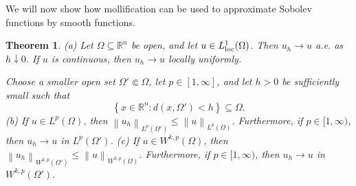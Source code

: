 \documentclass{book}
\newcommand{\bbR}{\mathbb{R}}
\newcommand{\norm}[1]{\left\lVert {#1} \right\rVert}
\newcommand{\set}[1]{\left\{ {#1} \right\}}
\newtheorem{theorem}{Theorem}[chapter]
\theoremstyle{definition}
\numberwithin{equation}{chapter}
\begin{document}
We will now show how mollification can be used to approximate Sobolev functions by smooth functions.
\begin{theorem}
    {\rm (a)} Let $\Omega \subseteq \bbR^n$ be open, and let $u \in L^1_{\rm loc}(\Omega)$. Then $u_h \to u$ a.e. as $h \downarrow 0$. If $u$ is continuous, then $u_h \to u$ locally uniformly.

    Choose a smaller open set $\Omega' \Subset \Omega$, let $p \in [1,\infty]$, and let $h > 0$ be sufficiently small such that 
    \begin{equation}
        \set{x \in \bbR^n : d(x,\Omega') < h} \subseteq \Omega.
    \end{equation}\newline
    {\rm (b)} If $u \in L^p(\Omega)$, then $\norm{u_h}_{L^p(\Omega')} \leq \norm{u}_{L^p(\Omega)}$. Furthermore, if $p \in [1,\infty)$, then $u_h \to u$ in $L^p(\Omega')$. \newline
    {\rm (c)} If $u \in W^{k,p}(\Omega)$, then $\norm{u_h}_{W^{k,p}(\Omega')} \leq \norm{u}_{W^{k,p}(\Omega)}$. Furthermore, if $p \in [1,\infty)$, then $u_h \to u$ in $W^{k,p}(\Omega')$.
\end{theorem}
\end{document}
